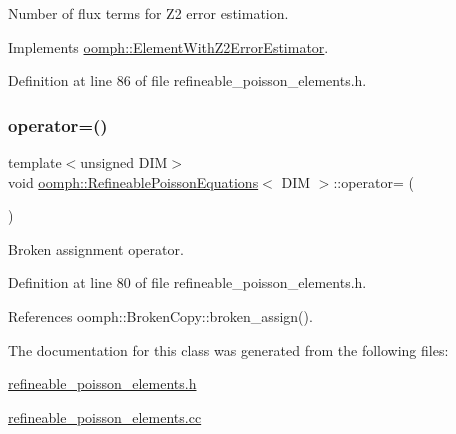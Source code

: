 Number of \textquotesingle{}flux\textquotesingle{} terms for Z2 error estimation. 



Implements \hyperlink{classoomph_1_1ElementWithZ2ErrorEstimator_ae82c5728902e13da31be19c390fc28e3}{oomph\+::\+Element\+With\+Z2\+Error\+Estimator}.



Definition at line 86 of file refineable\+\_\+poisson\+\_\+elements.\+h.

\mbox{\label{classoomph_1_1RefineablePoissonEquations_abacc091fa206b7a94fea160835ea3a62}} 
\subsubsection{\texorpdfstring{operator=()}{operator=()}}
{\footnotesize\ttfamily template$<$unsigned D\+IM$>$ \\
void \hyperlink{classoomph_1_1RefineablePoissonEquations}{oomph\+::\+Refineable\+Poisson\+Equations}$<$ D\+IM $>$\+::operator= (\begin{DoxyParamCaption}\item[{const \hyperlink{classoomph_1_1RefineablePoissonEquations}{Refineable\+Poisson\+Equations}$<$ D\+IM $>$ \&}]{ }\end{DoxyParamCaption})\hspace{0.3cm}{\ttfamily [inline]}}



Broken assignment operator. 



Definition at line 80 of file refineable\+\_\+poisson\+\_\+elements.\+h.



References oomph\+::\+Broken\+Copy\+::broken\+\_\+assign().



The documentation for this class was generated from the following files\+:\begin{DoxyCompactItemize}
\item 
\hyperlink{refineable__poisson__elements_8h}{refineable\+\_\+poisson\+\_\+elements.\+h}\item 
\hyperlink{refineable__poisson__elements_8cc}{refineable\+\_\+poisson\+\_\+elements.\+cc}\end{DoxyCompactItemize}
